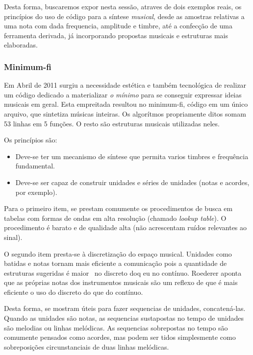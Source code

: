 Desta forma, buscaremos expor nesta sessão, atraves de dois exemplos reais,
os princípios do uso de código para a síntese \emph{musical}, desde as amostras
relativas a uma nota com dada frequencia, amplitude e timbre, até a confecção
de uma ferramenta derivada, já incorporando propostas musicais e estruturas
mais elaboradas.

      \subsubsection{Minimum-fi}

Em Abril de 2011 surgiu a necessidade estética e também tecnológica
de realizar um código dedicado a materializar \emph{o mínimo}
para se conseguir expressar ideias musicais em geral. Esta empreitada
resultou no minimum-fi, código em um único arquivo, que sintetiza
músicas inteiras. Os algorítmos propriamente ditos somam 
53 linhas em 5 funções. O resto são estruturas musicais utilizadas neles.

Os princípios são:
\begin{itemize}
  \item Deve-se ter um mecanismo de síntese que
permita varios timbres e frequência fundamental.
  \item Deve-se ser capaz de construir unidades e séries de unidades (notas e acordes, por exemplo).
\end{itemize}

Para o primeiro item, se prestam comumente os procedimentos de busca em tabelas com formas
de ondas em alta resolução (chamado \emph{lookup table}). O procedimento é barato e de qualidade alta
(não acrescentam ruídos relevantes ao sinal).


O segundo item presta-se à discretização do espaço musical. Unidades como batidas e notas
tornam mais eficiente a comunicação pois a quantidade
de estruturas sugeridas é maior~\cite{Roederer} no discreto doq eu no contínuo. Roederer
aponta que as próprias notas dos instrumentos musicais são um reflexo de que é mais eficiente
o uso do discreto do que do contínuo.

Desta forma, se mostram úteis para fazer sequencias de unidades, concatená-las. Quando as unidades
são notas, as sequencias sustapostas no tempo de unidades são melodias ou linhas melódicas. As
sequencias sobrepostas no tempo são comumente pensados como acordes, mas podem ser tidos simplesmente
como sobreposições circunstanciais de duas linhas melódicas.

